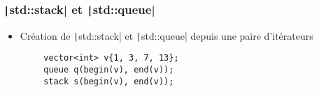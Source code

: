 \documentclass[C++.tex]{subfiles}
\begin{document}
\begin{frame}[fragile]
\end{frame}

\begin{frame}[fragile]
	\frametitle{\texttt|std::stack| et \texttt|std::queue|}
	\begin{itemize}
		\item Création de \texttt|std::stack| et \texttt|std::queue| depuis une paire d'itérateurs
	\end{itemize}

	\begin{verbatim}
		vector<int> v{1, 3, 7, 13};
		queue q(begin(v), end(v));
		stack s(begin(v), end(v));
	\end{verbatim}


\end{frame}
\end{document}
